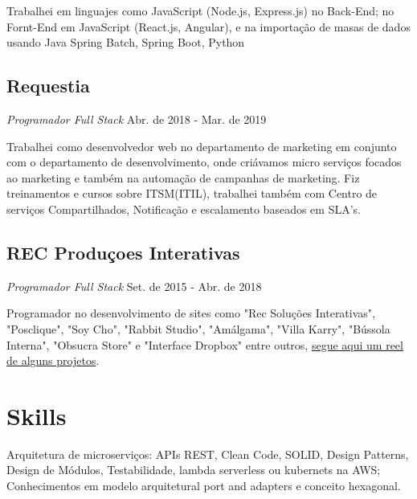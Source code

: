 \documentclass[a4paper,10pt]{article}
\begin{document}
Trabalhei em linguajes como JavaScript (Node.js, Express.js) no Back-End; no Fornt-End em JavaScript (React.js, Angular), e na importação de masas de dados usando Java Spring Batch, Spring Boot, Python

\subsection*{Requestia}
\textcolor{corSubSection}{\emph{Programador Full Stack}}
\hfill \textcolor{corSubSection}{Abr. de 2018 - Mar. de 2019}

Trabalhei como desenvolvedor web no departamento de marketing em conjunto com o departamento de desenvolvimento, onde criávamos micro serviços focados ao marketing e também na automação de campanhas de marketing. Fiz treinamentos e cursos sobre ITSM(ITIL), trabalhei também com Centro de serviços Compartilhados, Notificação e escalamento baseados em SLA's.

\subsection*{REC Produçoes Interativas}
\textcolor{corSubSection}{\emph{Programador Full Stack}}
\hfill \textcolor{corSubSection}{Set. de 2015 - Abr. de 2018}

Programador no desenvolvimento de sites como "Rec Soluções Interativas", "Posclique", "Soy Cho", "Rabbit Studio", "Amálgama", "Villa Karry", "Bússola Interna", "Obsucra Store" e "Interface Dropbox" entre outros, \href{https://www.youtube.com/watch?v=V_ahsuHgIoE}{segue aqui um reel de alguns projetos}.

%

\section*{Skills}
\noindent\makebox[\linewidth]{\rule{\linewidth}{0.1mm}\textcolor{corLarge}{}}

\textcolor{corSubSection}{Arquitetura de microserviços:}
APIs REST, Clean Code, SOLID, Design Patterns, Design de Módulos, Testabilidade, lambda serverless ou kubernets na AWS; Conhecimentos em modelo arquitetural port and adapters e conceito hexagonal.
\end{document}

